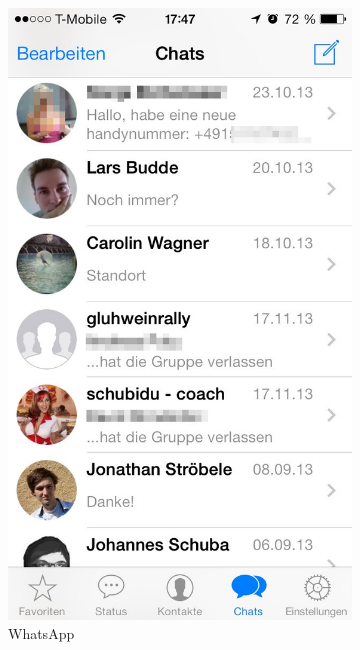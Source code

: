 \begin{figure}[h]
	\centering
	\begin{subfigure}{.33\textwidth}
  		\centering
  		\includegraphics[width=0.98\linewidth]{./images/whatsapp-screen.jpg}
  		\caption{WhatsApp}
  		\label{fig:ChatWA}
	\end{subfigure}
	\begin{subfigure}{.66\textwidth}
  		\centering

\end{subfigure}
\end{figure}
